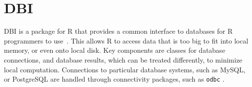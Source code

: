 \section{DBI}

DBI is a package for R that provides a common interface to databases for R
programmers to use~\cite{hid-sp18-403-R-r-dbi-dbi}. This allows R to access
data that is too big to fit into local memory, or even onto local disk. Key
components are classes for database connections, and database results, which
can be treated differently, to minimize local computation. Connections to
particular database systems, such as MySQL, or PostgreSQL are handled through
connectivity packages, such as \texttt{odbc}
\cite{hid-sp18-403-www-r-studio-odbc}.
